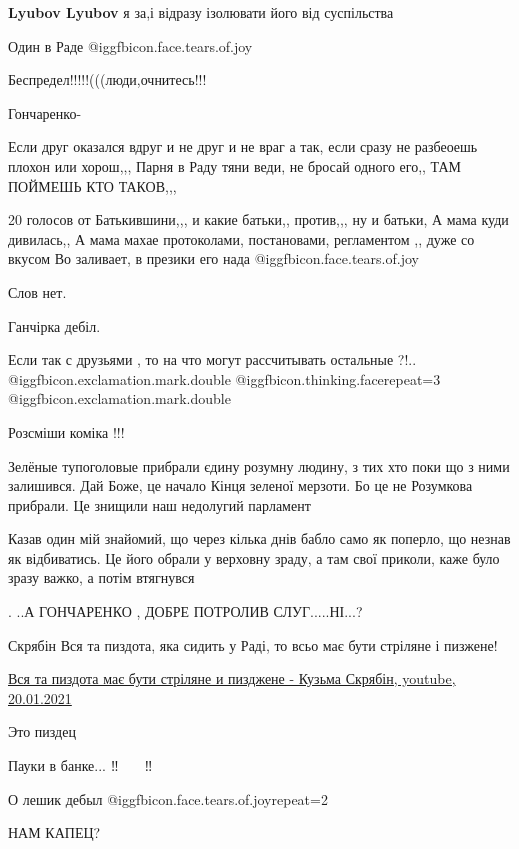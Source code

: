 \begin{itemize}
\begin{itemize}
\textbf{Lyubov Lyubov} я за,і відразу ізолювати його від суспільства
\end{itemize} %

Один в Раде  @igg{fbicon.face.tears.of.joy} 

Беспредел!!!!!(((люди,очнитесь!!!

Гончаренко-


Если друг оказался вдруг и не друг и не враг а так, если сразу не разбеоешь
плохон или хорош,,, Парня в Раду тяни веди, не бросай одного его,, ТАМ ПОЙМЕШЬ
КТО ТАКОВ,,,


20 голосов от Батькившини,,, и какие батьки,, против,,, ну и батьки, А мама
куди дивилась,, А мама махае протоколами, постановами, регламентом ,, дуже со
вкусом
Во заливает, в презики его нада  @igg{fbicon.face.tears.of.joy} 

Слов нет.

Ганчірка дебіл.


Если так с друзьями , то на что могут рассчитывать остальные ?!..
@igg{fbicon.exclamation.mark.double}  @igg{fbicon.thinking.face}{repeat=3}   @igg{fbicon.exclamation.mark.double}

Розсміши коміка !!!


Зелёные тупоголовые прибрали єдину розумну людину, з тих хто поки що з ними
залишився. Дай Боже, це начало Кінця зеленої мерзоти. Бо це не Розумкова
прибрали. Це знищили наш недолугий парламент



Казав один мій знайомий, що через кілька днів бабло само як поперло, що незнав
як відбиватись. Це його обрали у верховну зраду, а там свої приколи, каже було
зразу важко, а потім втягнувся


. ..А ГОНЧАРЕНКО , ДОБРЕ ПОТРОЛИВ СЛУГ.....НІ...?

Скрябін Вся та пиздота, яка сидить у Раді, то всьо має бути стріляне і пизжене!

\href{https://www.youtube.com/watch?v=bi6r20XzsLA}{%
Вся та пиздота має бути стріляне и пизджене - Кузьма Скрябін, youtube, 20.01.2021%
}

Это пиздец

Пауки в банке...
 ‼ ️  🔔🔔🔔  ‼ ️ 

О лешик дебыл  @igg{fbicon.face.tears.of.joy}{repeat=2} 

НАМ КАПЕЦ?

\end{itemize} %
